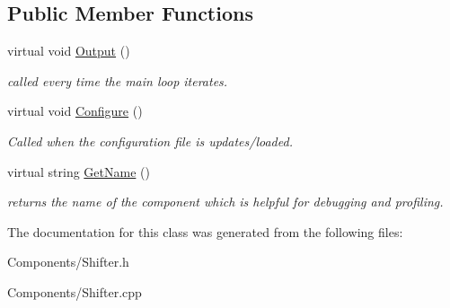 \subsection*{\-Public \-Member \-Functions}
\begin{DoxyCompactItemize}
\item 
\hypertarget{class_shifter_a125a695c747e2ecc8dca5bc7d92263df}{
virtual void \hyperlink{class_shifter_a125a695c747e2ecc8dca5bc7d92263df}{\-Output} ()}
\label{class_shifter_a125a695c747e2ecc8dca5bc7d92263df}

\begin{DoxyCompactList}\small\item\em called every time the main loop iterates. \end{DoxyCompactList}\item 
\hypertarget{class_shifter_a2035edb76bc861b3cf9fa6a8b763d7a9}{
virtual void \hyperlink{class_shifter_a2035edb76bc861b3cf9fa6a8b763d7a9}{\-Configure} ()}
\label{class_shifter_a2035edb76bc861b3cf9fa6a8b763d7a9}

\begin{DoxyCompactList}\small\item\em \-Called when the configuration file is updates/loaded. \end{DoxyCompactList}\item 
\hypertarget{class_shifter_af5abaaa762bbf51f3bc3f669f0078b62}{
virtual string \hyperlink{class_shifter_af5abaaa762bbf51f3bc3f669f0078b62}{\-Get\-Name} ()}
\label{class_shifter_af5abaaa762bbf51f3bc3f669f0078b62}

\begin{DoxyCompactList}\small\item\em returns the name of the component which is helpful for debugging and profiling. \end{DoxyCompactList}\end{DoxyCompactItemize}


\-The documentation for this class was generated from the following files\-:\begin{DoxyCompactItemize}
\item 
\-Components/\-Shifter.\-h\item 
\-Components/\-Shifter.\-cpp\end{DoxyCompactItemize}
